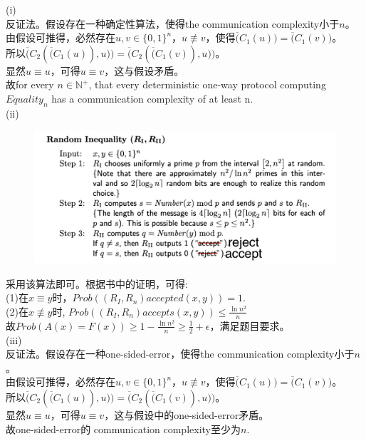 \documentclass[a4paper, justified]{tufte-handout}
\begin{document}
\begin{solution}
(i)\\
反证法。假设存在一种确定性算法，使得the communication complexity小于$n$。\\
由假设可推得，必然存在$u,v\in\{0,1\}^{n}$，$u\not\equiv v$，使得$\overline(C_1(u))=\overline(C_1(v))$。\\
所以$\overline(C_2(\overline(C_1(u)),u))=\overline(C_2(\overline(C_1(v)),u))$。\\
显然$u\equiv u$，可得$u \equiv v$，这与假设矛盾。\\
故for every $n\in \mathbb{N}^{+}$, that every deterministic one-way protocol computing $Equality_n$ has a communication complexity of at least n.\\
\newpage
(ii)\\
 \begin{figure}[htbp]
    \centering
    \includegraphics[width = 0.90\linewidth]{figs/a}
  \end{figure}
  
  
采用该算法即可。根据书中的证明，可得:\\
(1)在$x\equiv y$时，$Prob((R_I,R_n) accepted (x,y)) = 1$.\\
(2)在$x\not\equiv y$时, $Prob((R_I,R_n) accepts (x,y))\leq \frac{\ln n^2}{n}$\\
故$Prob(A(x)=F(x)) \geq 1-\frac{\ln n^2}{n}\geq \frac{1}{2}+\epsilon$，满足题目要求。\\
(iii)\\ 
反证法。假设存在一种one-sided-error，使得the communication complexity小于$n$。\\
由假设可推得，必然存在$u,v\in\{0,1\}^{n}$，$u\not\equiv v$，使得$\overline(C_1(u))=\overline(C_1(v))$。\\
所以$\overline(C_2(\overline(C_1(u)),u))=\overline(C_2(\overline(C_1(v)),u))$。\\
显然$u\equiv u$，可得$u \equiv v$，这与假设中的one-sided-error矛盾。\\
故one-sided-error的 communication complexity至少为$n$.\\

\end{solution}
\end{document}
